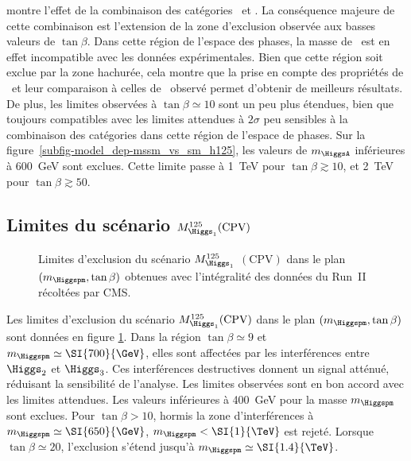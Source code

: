 montre l'effet de la combinaison des catégories \CATbsm\ et \CATsm.
La conséquence majeure de cette combinaison est l'extension de la zone d'exclusion observée aux basses valeurs de $\tan\beta$.
Dans cette région de l'espace des phases, la masse de \higgsMSSM\ est en effet incompatible avec les données expérimentales.
Bien que cette région soit exclue par la zone hachurée,
cela montre que la prise en compte des propriétés de \higgsMSSM\
et leur comparaison à celles de \higgs\ observé permet d'obtenir de meilleurs résultats.
De plus, les limites observées à $\tan\beta\simeq\num{10}$ sont un peu plus étendues,
bien que toujours compatibles avec les limites attendues à $2\sigma$
peu sensibles à la combinaison des catégories dans cette région de l'espace de phases.
Sur la figure~\ref{subfig-model_dep-mssm_vs_sm_h125},
les valeurs de $m_{\HiggsA}$ inférieures à \SI{600}{\GeV} sont exclues.
Cette limite passe à \SI{1}{\TeV} pour $\tan\beta\gtrsim\num{10}$,
et \SI{2}{\TeV} pour $\tan\beta\gtrsim\num{50}$.
\subsection[Limites du scénario $M_{\Higgs_1}^{125}$ avec violation de $CP$]{Limites du scénario $M_{\Higgs_1}^{125}(\text{CPV})$}
\begin{wrapfigure}[16]{R}{.475\textwidth}
\vspace{-3\baselineskip}
\centering
{}
\caption[Limites d'exclusion du scénario $M_{\Higgs_1}^{125}(\text{CPV})$.]{Limites d'exclusion du scénario $M_{\Higgs_1}^{125}$ $(\text{CPV})$ dans le plan $(m_{\Higgspm},\tan\beta)$ obtenues avec l'intégralité des données du Run~II récoltées par CMS.}
\label{fig-model_dep-CPV}
\end{wrapfigure}
Les limites d'exclusion du scénario $M_{\Higgs_1}^{125}(\text{CPV})$ dans le plan $(m_{\Higgspm},\tan\beta)$
sont données en figure \ref{fig-model_dep-CPV}.
Dans la région $\tan\beta\simeq\num{9}$ et $m_{\Higgspm}\simeq\SI{700}{\GeV}$,
elles sont affectées par les interférences entre $\Higgs_2$ et $\Higgs_3$.
Ces interférences destructives donnent un signal atténué, réduisant la sensibilité de l'analyse.
Les limites observées sont en bon accord avec les limites attendues.
Les valeurs inférieures à \SI{400}{\GeV} pour la masse $m_{\Higgspm}$ sont exclues.
Pour $\tan\beta>\num{10}$,
hormis la zone d'interférences à $m_{\Higgspm} \simeq \SI{650}{\GeV}$,
$m_{\Higgspm} < \SI{1}{\TeV}$ est rejeté.
Lorsque
$\tan\beta\simeq\num{20}$,
l'exclusion s'étend jusqu'à
$m_{\Higgspm} \simeq \SI{1.4}{\TeV}$.

